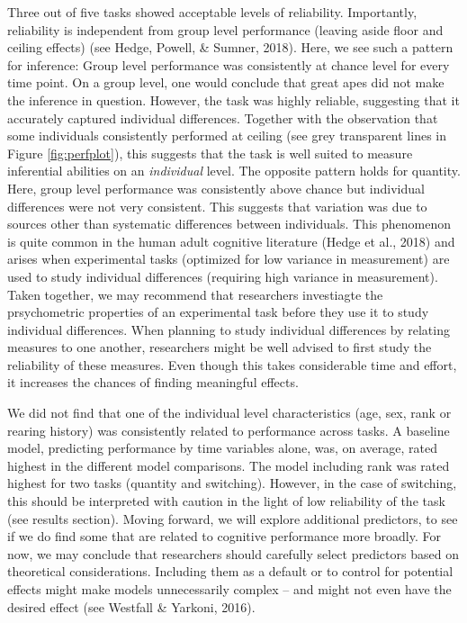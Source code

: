 \documentclass[10pt, letterpaper]{article}
\begin{document}
Three out of five tasks showed acceptable levels of reliability.
Importantly, reliability is independent from group level performance
(leaving aside floor and ceiling effects) (see Hedge, Powell, \& Sumner,
2018). Here, we see such a pattern for inference: Group level
performance was consistently at chance level for every time point. On a
group level, one would conclude that great apes did not make the
inference in question. However, the task was highly reliable, suggesting
that it accurately captured individual differences. Together with the
observation that some individuals consistently performed at ceiling (see
grey transparent lines in Figure \ref{fig:perfplot}), this suggests that
the task is well suited to measure inferential abilities on an
\emph{individual} level. The opposite pattern holds for quantity. Here,
group level performance was consistently above chance but individual
differences were not very consistent. This suggests that variation was
due to sources other than systematic differences between individuals.
This phenomenon is quite common in the human adult cognitive literature
(Hedge et al., 2018) and arises when experimental tasks (optimized for
low variance in measurement) are used to study individual differences
(requiring high variance in measurement). Taken together, we may
recommend that researchers investiagte the prsychometric properties of
an experimental task before they use it to study individual differences.
When planning to study individual differences by relating measures to
one another, researchers might be well advised to first study the
reliability of these measures. Even though this takes considerable time
and effort, it increases the chances of finding meaningful effects.

We did not find that one of the individual level characteristics (age,
sex, rank or rearing history) was consistently related to performance
across tasks. A baseline model, predicting performance by time variables
alone, was, on average, rated highest in the different model
comparisons. The model including rank was rated highest for two tasks
(quantity and switching). However, in the case of switching, this should
be interpreted with caution in the light of low reliability of the task
(see results section). Moving forward, we will explore additional
predictors, to see if we do find some that are related to cognitive
performance more broadly. For now, we may conclude that researchers
should carefully select predictors based on theoretical considerations.
Including them as a default or to control for potential effects might
make models unnecessarily complex -- and might not even have the desired
effect (see Westfall \& Yarkoni, 2016).
\end{document}
